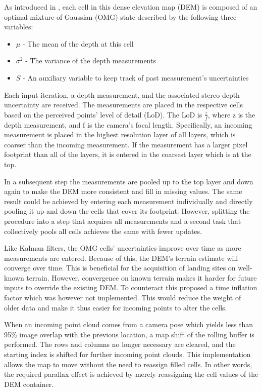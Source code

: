 \documentclass{article}
\begin{document}
As introduced in \citet{LSD2}, each cell in this dense elevation map (DEM) is composed of an optimal mixture of Gaussian (OMG) state described by the following three variables:

\begin{itemize}
    \item $\mu$ - The mean of the depth at this cell
    \item $\sigma^2$ - The variance of the depth measurements
    \item $S$ - An auxiliary variable to keep track of past measurement's uncertainties
\end{itemize}

Each input iteration, a depth measurement, and the associated stereo depth uncertainty are received. The measurements are placed in the respective cells based on the perceived points' level of detail (LoD). The LoD is $\frac{z}{f}$, where z is the depth measurement, and f is the camera's focal length. Specifically, an incoming measurement is placed in the highest resolution layer of all layers, which is coarser than the incoming measurement. If the measurement has a larger pixel footprint than all of the layers, it is entered in the coarsest layer which is at the top.

In a subsequent step the measurements are pooled up to the top layer and down again to make the DEM more consistent and fill in missing values. The same result could be achieved by entering each measurement individually and directly pooling it up and down the cells that cover its footprint. However, splitting the procedure into a step that acquires all measurements and a second task that collectively pools all cells achieves the same with fewer updates.

Like Kalman filters, the OMG cells' uncertainties improve over time as more measurements are entered. Because of this, the DEM's terrain estimate will converge over time. This is beneficial for the acquisition of landing sites on well-known terrain. However, convergence on known terrain makes it harder for future inputs to override the existing DEM. To counteract this \citet{LSD2} proposed a time inflation factor which was however not implemented. This would reduce the weight of older data and make it thus easier for incoming points to alter the cells.

When an incoming point cloud comes from a camera pose which yields less than 95\%  image overlap with the previous location, a map shift of the rolling buffer is performed. The rows and columns no longer necessary are cleared, and the starting index is shifted for further incoming point clouds. This implementation allows the map to move without the need to reassign filled cells. In other words, the required parallax effect is achieved by merely reassigning the cell values of the DEM container.
\end{document}

